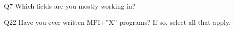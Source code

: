 \begin{description}%
\item{Q7} Which fields are you mostly working in?%
\item{Q22} Have you ever written MPI+”X” programs? If so, select all that apply.%
\end{description}%
